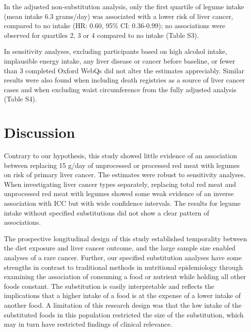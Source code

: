 \documentclass[nutrients,article,submit,moreauthors,pdftex]{Definitions/mdpi}
\begin{document}
In the adjusted non-substitution analysis, only the first quartile of
legume intake (mean intake 6.3 grams/day) was associated with a lower
risk of liver cancer, compared to no intake
(HR: 0.60, 95\% CI: 0.36-0.99);
no associations were observed for quartiles 2, 3 or 4 compared to no
intake (Table S3).

In sensitivity analyses, excluding participants based on high alcohol
intake, implausible energy intake, any liver disease or cancer before
baseline, or fewer than 3 completed Oxford WebQs did not alter the
estimates appreciably. Similar results were also found when including
death registries as a source of liver cancer cases and when excluding
waist circumference from the fully adjusted analysis (Table S4).

\hypertarget{sec4}{%
\section{Discussion}\label{sec4}}

Contrary to our hypothesis, this study showed little evidence of an
association between replacing 15 g/day of unprocessed or processed red
meat with legumes on risk of primary liver cancer. The estimates were
robust to sensitivity analyses. When investigating liver cancer types
separately, replacing total red meat and unprocessed red meat with
legumes showed some weak evidence of an inverse association with ICC but
with wide confidence intervals. The results for legume intake without
specified substitutions did not show a clear pattern of associations.

The prospective longitudinal design of this study established
temporality between the diet exposure and liver cancer outcome, and the
large sample size enabled analyses of a rare cancer. Further, our
specified substitution analyses have some strengths in contrast to
traditional methods in nutritional epidemiology through examining the
association of consuming a food or nutrient while holding all other
foods constant. The substitution is easily interpretable and reflects
the implications that a higher intake of a food is at the expense of a
lower intake of another food. A limitation of this research design was
that the low intake of the substituted foods in this population
restricted the size of the substitution, which may in turn have
restricted findings of clinical relevance.
\end{document}

